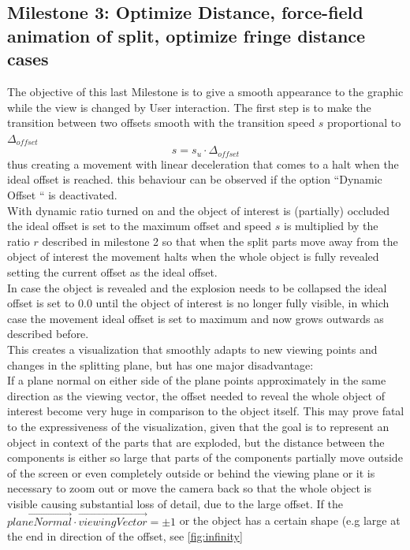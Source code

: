 \subsection{Milestone 3: Optimize Distance, force-field animation of split, optimize fringe distance cases} 

The objective of this last Milestone is to give a smooth appearance to the graphic while the view is changed by User interaction. The first step is to make the transition between two offsets smooth with the transition speed $s$ proportional to $\Delta_{offset}$
\begin{equation}
	s=s_u \cdot \Delta_{offset}
\end{equation}
thus creating a movement with linear deceleration that comes to a halt when the ideal offset is reached. this behaviour can be observed if the option ``Dynamic Offset `` is deactivated.\\
With dynamic ratio turned on and the object of interest is (partially) occluded the ideal offset is set to the maximum  offset and speed $s$ is multiplied by the ratio $r$ described in milestone 2 so that when the split parts move away from the object of interest the movement halts when the whole object is fully revealed setting the current offset as the ideal offset.\\
In case the object is revealed and the explosion needs to be collapsed the ideal offset is set to 0.0 until the object of interest is no longer fully visible, in which case the movement ideal offset is set to maximum and now grows outwards as described before.\\
This creates a visualization that smoothly adapts to new viewing points and changes in the splitting plane, but has one major disadvantage:\\
If a plane normal on either side of the plane points approximately in the same direction as the viewing vector,  the offset needed to reveal the whole object of interest become very huge in comparison to the object itself. This may prove fatal to the expressiveness of the visualization, given that the goal is to represent an object in context of the parts that are exploded, but the distance between the components is either so large that parts of the components partially move outside of the screen or even completely outside or behind the viewing plane or it is necessary to zoom out or move the camera back so that the whole object is visible causing substantial loss of detail, due to the large offset. If the $\vec{planeNormal} \cdot \vec{viewingVector} = \pm1$ or the object has a certain shape (e.g large at the end in direction of the offset, see  \ref{fig:infinity}
